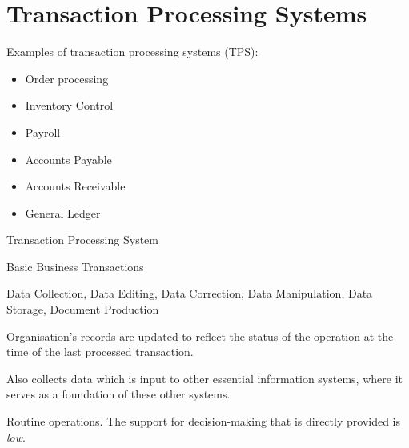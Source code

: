 \documentclass[\main/notes.tex]{subfiles}
\begin{document}
		\pagebreak
		\section{Transaction Processing Systems}
			Examples of transaction processing systems (TPS):
			\begin{multicols}{2}
				\begin{itemize}[nosep]
					\item Order processing
					\item Inventory Control
					\item Payroll
					\item Accounts Payable
					\item Accounts Receivable
					\item General Ledger
				\end{itemize}
			\end{multicols}
			\begin{sidenote}{Transaction Processing System}
				\begin{description}[nosep]
					\item[Input] Basic Business Transactions
					\item[Processing] Data Collection, Data Editing, Data Correction, Data Manipulation, Data Storage, Document Production
					\item[Result] Organisation's records are updated to reflect the status of the operation at the time of the last processed transaction.
				\end{description}
				Also collects data which is input to other essential information systems, where it serves as a foundation of these other systems.

				Routine operations. The support for decision-making that is directly provided is \emph{low}.
			\end{sidenote}
\end{document}
